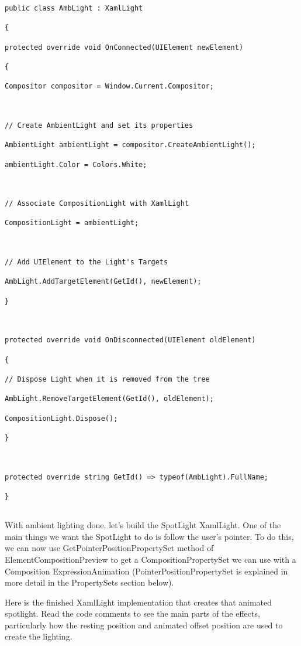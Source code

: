 \begin{lstlisting}[style=CSharpStyle]
public class AmbLight : XamlLight

{

protected override void OnConnected(UIElement newElement)

{

Compositor compositor = Window.Current.Compositor;



// Create AmbientLight and set its properties

AmbientLight ambientLight = compositor.CreateAmbientLight();

ambientLight.Color = Colors.White;



// Associate CompositionLight with XamlLight

CompositionLight = ambientLight;



// Add UIElement to the Light's Targets

AmbLight.AddTargetElement(GetId(), newElement);

}



protected override void OnDisconnected(UIElement oldElement)

{

// Dispose Light when it is removed from the tree

AmbLight.RemoveTargetElement(GetId(), oldElement);

CompositionLight.Dispose();

}



protected override string GetId() => typeof(AmbLight).FullName;

}


\end{lstlisting}

With ambient lighting done, let’s build the SpotLight XamlLight. One of the main things we want the SpotLight to do is follow the user’s pointer. To do this, we can now use GetPointerPositionPropertySet method of ElementCompositionPreview to get a CompositionPropertySet we can use with a Composition ExpressionAnimation (PointerPositionPropertySet is explained in more detail in the PropertySets section below).

Here is the finished XamlLight implementation that creates that animated spotlight. Read the code comments to see the main parts of the effects, particularly how the resting position and animated offset position are used to create the lighting.

